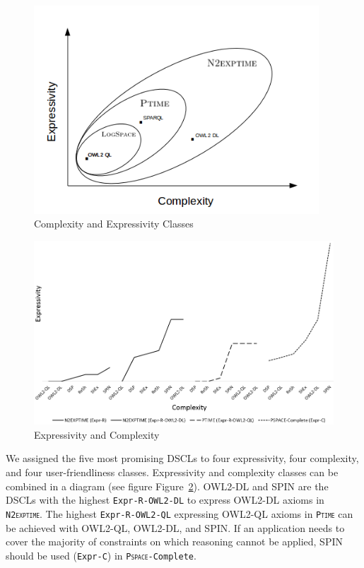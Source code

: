\documentclass{llncs}
\newcommand{\ms}[1]{\texttt{#1}}
\begin{document}
\begin{figure}
	\centering
		\includegraphics[width=0.95\textwidth]{complexiity_and_expressivity.png}
	\caption{Complexity and Expressivity Classes}
	\label{fig:VennDiagram}
\end{figure}
  
\begin{figure}
	\centering
		\includegraphics[width=1.00\textwidth]{expressivity-complexity-3.png}
	\caption{Expressivity and Complexity}
	\label{fig:expressivity-complexity}
\end{figure}

We assigned the five most promising DSCLs to four expressivity, four complexity, and four user-friendliness classes.
Expressivity and complexity classes can be combined in a diagram (see figure Figure~\ref{fig:expressivity-complexity}).
OWL2-DL and SPIN are the DSCLs with the highest \ms{Expr-R-OWL2-DL} to express OWL2-DL axioms in \ms{\textsc{N2exptime}}.
The highest \ms{Expr-R-OWL2-QL} expressing OWL2-QL axioms in \ms{\textsc{Ptime}} can be achieved with OWL2-QL, OWL2-DL, and SPIN.
If an application needs to cover the majority of constraints on which reasoning cannot be applied, SPIN should be used (\ms{Expr-C}) in \ms{\textsc{Pspace}-Complete}.
\end{document}
